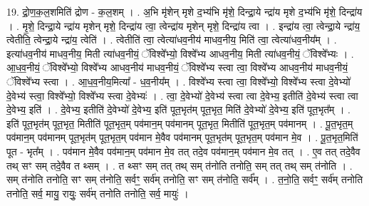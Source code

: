 \documentclass[17pt]{extarticle}
\begin{document}
19. द्रो॒ण॒क॒ल॒शमिति॑ द्रोण - क॒ल॒शम् । . अ॒भि मृ॑शेन् मृशे द॒भ्य॑भि मृ॑शे॒ दिन्द्रा॒ये न्द्रा॑य मृशे द॒भ्य॑भि मृ॑शे॒ दिन्द्रा॑य । . मृ॒शे॒ दिन्द्रा॒ये न्द्रा॑य मृशेन् मृशे॒ दिन्द्रा॑य त्वा॒ त्वेन्द्रा॑य मृशेन् मृशे॒ दिन्द्रा॑य त्वा । . इन्द्रा॑य त्वा॒ त्वेन्द्रा॒ये न्द्रा॑य॒ त्वेतीति॒ त्वेन्द्रा॒ये न्द्रा॑य॒ त्वेति॑ । . त्वेतीति॑ त्वा॒ त्वेत्या॑धव॒नीय॑ माधव॒नीय॒ मिति॑ त्वा॒ त्वेत्या॑धव॒नीय᳚म् । . इत्या॑धव॒नीय॑ माधव॒नीय॒ मिती त्या॑धव॒नीयं॒ ॅविश्वे᳚भ्यो॒ विश्वे᳚भ्य आधव॒नीय॒ मिती त्या॑धव॒नीयं॒ ॅविश्वे᳚भ्यः । . आ॒ध॒व॒नीयं॒ ॅविश्वे᳚भ्यो॒ विश्वे᳚भ्य आधव॒नीय॑ माधव॒नीयं॒ ॅविश्वे᳚भ्य स्त्वा त्वा॒ विश्वे᳚भ्य आधव॒नीय॑ माधव॒नीयं॒ ॅविश्वे᳚भ्य स्त्वा । . आ॒ध॒व॒नीय॒मित्या᳚ - ध॒व॒नीय᳚म् । . विश्वे᳚भ्य स्त्वा त्वा॒ विश्वे᳚भ्यो॒ विश्वे᳚भ्य स्त्वा दे॒वेभ्यो॑ दे॒वेभ्य॑ स्त्वा॒ विश्वे᳚भ्यो॒ विश्वे᳚भ्य स्त्वा दे॒वेभ्यः॑ । . त्वा॒ दे॒वेभ्यो॑ दे॒वेभ्य॑ स्त्वा त्वा दे॒वेभ्य॒ इतीति॑ दे॒वेभ्य॑ स्त्वा त्वा दे॒वेभ्य॒ इति॑ । . दे॒वेभ्य॒ इतीति॑ दे॒वेभ्यो॑ दे॒वेभ्य॒ इति॑ पूत॒भृत॑म् पूत॒भृत॒ मिति॑ दे॒वेभ्यो॑ दे॒वेभ्य॒ इति॑ पूत॒भृत᳚म् । . इति॑ पूत॒भृत॑म् पूत॒भृत॒ मितीति॑ पूत॒भृत॒म् पव॑मान॒म् पव॑मानम् पूत॒भृत॒ मितीति॑ पूत॒भृत॒म् पव॑मानम् । . पू॒त॒भृत॒म् पव॑मान॒म् पव॑मानम् पूत॒भृत॑म् पूत॒भृत॒म् पव॑मान मे॒वैव पव॑मानम् पूत॒भृत॑म् पूत॒भृत॒म् पव॑मान मे॒व । . पू॒त॒भृत॒मिति॑ पूत - भृत᳚म् । . पव॑मान मे॒वैव पव॑मान॒म् पव॑मान मे॒व तत् तदे॒व पव॑मान॒म् पव॑मान मे॒व तत् । . ए॒व तत् तदे॒वैव तथ् सꣳ सम् तदे॒वैव त थ्सम् । . त थ्सꣳ सम् तत् तथ् सम् त॑नोति तनोति॒ सम् तत् तथ् सम् त॑नोति । . सम् त॑नोति तनोति॒ सꣳ सम् त॑नोति॒ सर्वꣳ॒॒ सर्व॑म् तनोति॒ सꣳ सम् त॑नोति॒ सर्व᳚म् । . त॒नो॒ति॒ सर्वꣳ॒॒ सर्व॑म् तनोति तनोति॒ सर्व॒ मायु॒ रायुः॒ सर्व॑म् तनोति तनोति॒ सर्व॒ मायुः॑ । \newline
\end{document}
